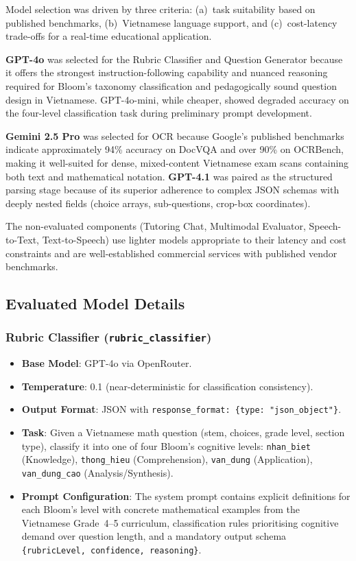 \documentclass[12pt, a4paper]{article}
\begin{document}
Model selection was driven by three criteria: (a)~task suitability based on published benchmarks, (b)~Vietnamese language support, and (c)~cost-latency trade-offs for a real-time educational application.

\textbf{GPT-4o} was selected for the Rubric Classifier and Question Generator because it offers the strongest instruction-following capability and nuanced reasoning required for Bloom's taxonomy classification and pedagogically sound question design in Vietnamese. GPT-4o-mini, while cheaper, showed degraded accuracy on the four-level classification task during preliminary prompt development.

\textbf{Gemini 2.5 Pro} was selected for OCR because Google's published benchmarks indicate approximately 94\% accuracy on DocVQA and over 90\% on OCRBench, making it well-suited for dense, mixed-content Vietnamese exam scans containing both text and mathematical notation. \textbf{GPT-4.1} was paired as the structured parsing stage because of its superior adherence to complex JSON schemas with deeply nested fields (choice arrays, sub-questions, crop-box coordinates).

The non-evaluated components (Tutoring Chat, Multimodal Evaluator, Speech-to-Text, Text-to-Speech) use lighter models appropriate to their latency and cost constraints and are well-established commercial services with published vendor benchmarks.

\subsection{Evaluated Model Details}

\subsubsection{Rubric Classifier (\texttt{rubric\_classifier})}
\begin{itemize}[nosep]
    \item \textbf{Base Model}: GPT-4o via OpenRouter.
    \item \textbf{Temperature}: 0.1 (near-deterministic for classification consistency).
    \item \textbf{Output Format}: JSON with \texttt{response\_format: \{type: "json\_object"\}}.
    \item \textbf{Task}: Given a Vietnamese math question (stem, choices, grade level, section type), classify it into one of four Bloom's cognitive levels: \texttt{nhan\_biet} (Knowledge), \texttt{thong\_hieu} (Comprehension), \texttt{van\_dung} (Application), \texttt{van\_dung\_cao} (Analysis/Synthesis).
    \item \textbf{Prompt Configuration}: The system prompt contains explicit definitions for each Bloom's level with concrete mathematical examples from the Vietnamese Grade~4--5 curriculum, classification rules prioritising cognitive demand over question length, and a mandatory output schema \texttt{\{rubricLevel, confidence, reasoning\}}.
\end{itemize}
\end{document}
